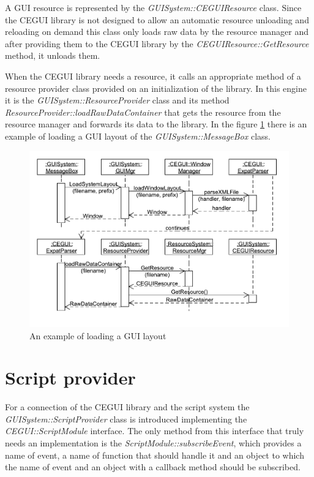 \documentclass[a4paper, 12pt]{report}
\begin{document}
A GUI resource is represented by the \emph{GUISystem::CEGUIResource} class. Since the CEGUI library is not designed to allow an automatic resource unloading and reloading on demand this class only loads raw data by the resource manager and after providing them to the CEGUI library by the \emph{CEGUIResource::GetResource} method, it unloads them.

When the CEGUI library needs a resource, it calls an appropriate method of a resource provider class provided on an initialization of the library. In this engine it is the \emph{GUISystem::ResourceProvider} class and its method \emph{ResourceProvider::loadRawDataContainer} that gets the resource from the resource manager and forwards its data to the library. In the figure \ref{fig:load-layout-sequence} there is an example of loading a GUI layout of the \emph{GUISystem::MessageBox} class.

\begin{figure}[htbp]
	\centering
		\includegraphics[width=1\textwidth]{LoadLayoutSequence.pdf}
	\caption{An example of loading a GUI layout}
	\label{fig:load-layout-sequence}
\end{figure}

\section{Script provider}
\label{sec:gui-script}

For a connection of the CEGUI library and the script system the \emph{GUISystem::ScriptProvider} class is introduced implementing the \emph{CEGUI::Script\-Module} interface. The only method from this interface that truly needs an implementation is the \emph{ScriptModule::subscribeEvent}, which provides a name of event, a name of function that should handle it and an object to which the name of event and an object with a callback method should be subscribed.
\end{document}
